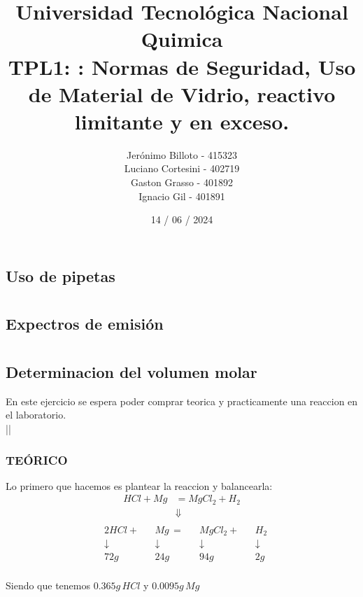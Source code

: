 \documentclass[12pt]{report}
\title{%
  \fontsize{25}{0}\selectfont Universidad Tecnológica Nacional \\
  \fontsize{22}{30}\selectfont Quimica \\
  \fontsize{18}{25}\selectfont TPL1: : Normas de Seguridad, Uso de Material de Vidrio, reactivo limitante y en exceso.
}
\author{
  Jerónimo Billoto - 415323\\
  Luciano Cortesini - 402719\\
  Gaston Grasso - 401892\\
  Ignacio Gil - 401891\\
}
\date{14 / 06 / 2024}
\begin{document}
\maketitle
\chapter{}
\section{Uso de pipetas}

\chapter{}
\section{Expectros de emisión}


\chapter{}
\section{Determinacion del volumen molar}

En este ejercicio se espera poder comprar teorica y practicamente una reaccion en el laboratorio.\\||

\subsection{TEÓRICO}

Lo primero que hacemos es plantear la reaccion y balancearla:\\
$$
\begin{aligned}
    HCl + Mg &= MgCl_2 + H_2\\[6pt]
    &\Downarrow\\[6pt]
\end{aligned}
$$
$$
\begin{aligned}
    &2HCl + &&Mg \, = &&MgCl_2 + &&H_2 \\[6pt]
    &\downarrow &&\downarrow &&\downarrow &&\downarrow \\
    &72g &&24g &&94g &&2g \\[12pt]
\end{aligned}
$$

Siendo que tenemos $0.365g \, HCl$ y $0.0095g \, Mg$\\
\end{document}
